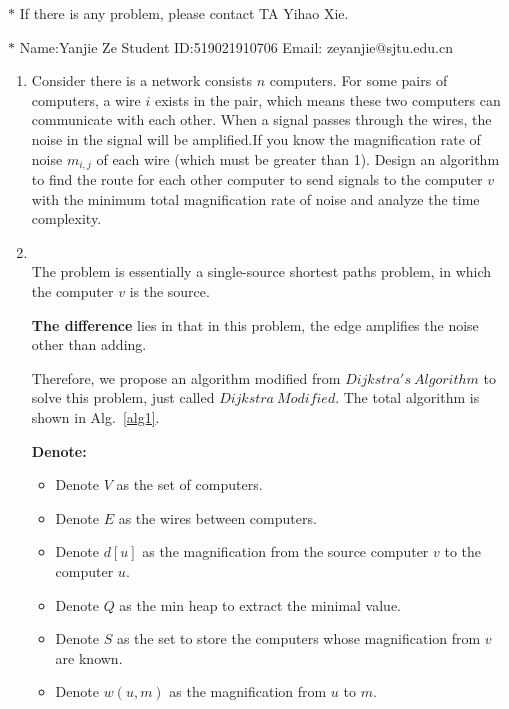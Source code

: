 \documentclass[12pt,a4paper]{article}
\makeatletter
\newtheorem*{solution}{Solution}
\theoremstyle{definition}
\renewenvironment{solution}[1][Solution] {\par\pushQED{\qed}\normalfont\topsep6\p@\@plus6\p@\relax\trivlist\item[\hskip\labelsep\bfseries#1\@addpunct{.}]\ignorespaces}{\popQED\endtrivlist\@endpefalse} \makeatother
\makeatother
\begin{document}
\noindent

\noindent{}
\begin{center}
\footnotesize{\color{red}$*$ If there is any problem, please contact TA Yihao Xie. }

\footnotesize{\color{blue}$*$ Name:Yanjie Ze  \quad Student ID:519021910706 \quad Email: zeyanjie@sjtu.edu.cn}
\end{center}

\begin{enumerate}
    \item  Consider there is a network consists $n$ computers. For some pairs of computers, a wire $i$ exists in the pair, which means these two computers can communicate with each other. When a signal passes through the wires, the noise in the signal will be amplified.If you know the magnification rate of noise $m_{i,j}$ of each wire (which must be greater than 1). Design an algorithm to find the route  for each other computer to send signals to the computer $v$ with the minimum total magnification rate of noise and analyze the time complexity.
    \begin{solution}
    ~\\
    The problem is essentially a single-source shortest paths problem, in which the computer $v$ is the source. 
    
    \textbf{The difference} lies in that in this problem, the edge amplifies the noise other than adding.
    
    Therefore, we propose an algorithm modified from $Dijkstra's\ Algorithm$ to solve this problem, just called $Dijkstra\ Modified$. The total algorithm is shown in Alg.~\ref{alg1}.
    
    \textbf{Denote:}
    \begin{itemize}
    \item
    Denote $V$ as the set of computers.
    \item
    Denote $E$ as the wires between computers.
        \item 
    Denote $d[u]$ as the magnification from the source computer $v$ to the computer $u$.
    \item
    Denote $Q$ as the min heap to extract the minimal value.
    \item
    Denote $S$ as the set to store the computers whose magnification from $v$ are known.
    \item Denote $w(u,m)$ as the magnification from $u$ to $m$.
        \end{itemize}


\end{solution}
\end{enumerate}
\end{document}
